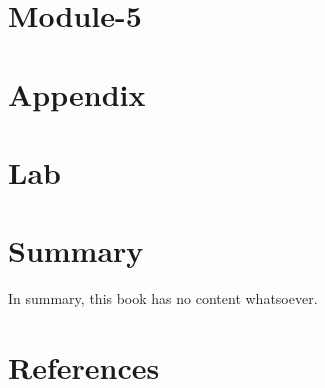 \documentclass[
  letterpaper,
  DIV=11,
  numbers=noendperiod]{scrreprt}
\begin{document}
\chapter{Module-5}\label{module-5}


\chapter{Appendix}\label{appendix}


\chapter{Lab}\label{lab}


\chapter{Summary}\label{summary}

In summary, this book has no content whatsoever.


\chapter*{References}\label{references}


\protect{}\label{refs}
\end{document}
